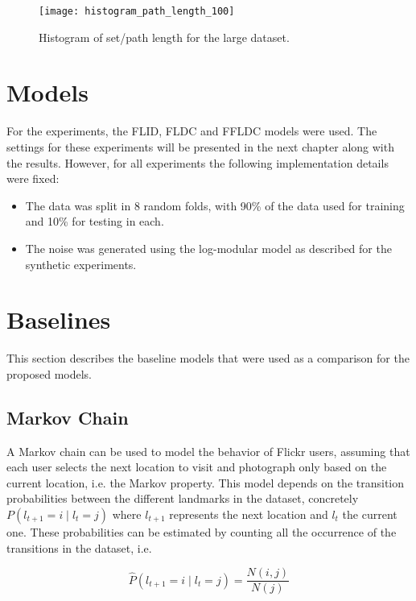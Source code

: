 \begin{figure}
  \centering
  \texttt{[image: histogram\_path\_length\_100]}
  \caption{Histogram of set/path length for the large dataset.}
  \label{fig:histogram_path_length_100}
\end{figure}

\section{Models}

For the experiments, the FLID, FLDC and FFLDC models were used. The settings for these experiments will be presented in the next chapter along with the results. However, for all experiments the following implementation details were fixed:

\begin{itemize}
  \item The data was split in 8 random folds, with 90\% of the data used for training and 10\% for testing in each.
  \item The noise was generated using the log-modular model as described for the synthetic experiments.
\end{itemize}

\section{Baselines}
\label{sec:baselines}

This section describes the baseline models that were used as a comparison for the proposed models.

\subsection{Markov Chain}

A Markov chain can be used to model the behavior of Flickr users, assuming that each user selects the next location to visit and photograph only based on the current location, i.e. the Markov property. This model depends on the transition probabilities between the different landmarks in the dataset, concretely $P(l_{t+1} = i \mid l_{t} = j)$ where $l_{t+1}$ represents the next location and $l_{t}$ the current one. These probabilities can be estimated by counting all the occurrence of the transitions in the dataset, i.e.

\begin{equation}
  \hat{P}(l_{t+1} = i \mid l_{t} = j) = \frac{N(i,j)}{N(j)}
\end{equation}


